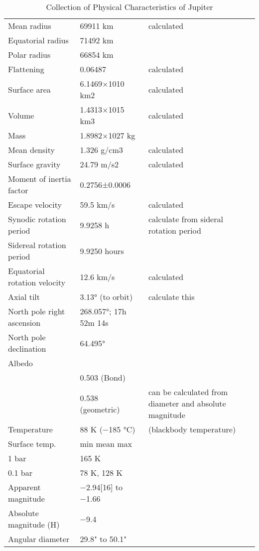 \begin{table}[h]
\begin{tabular}{ | l | l | p{3cm}|}
\hline
Mean radius&69911 km & calculated\\
Equatorial radius&71492 km & \\
Polar radius&66854 km & \\
Flattening&0.06487 & calculated\\
Surface area&6.1469×1010 km2 & calculated\\
Volume&1.4313×1015 km3 & calculated\\
Mass&1.8982×1027 kg & \\
Mean density&1.326 g/cm3 & calculated\\
Surface gravity&24.79 m/s2 & calculated\\
Moment of inertia factor&0.2756±0.0006 & \\
Escape velocity&59.5 km/s & calculated\\
Synodic rotation period&9.9258 h & calculate from sideral rotation period \\
Sidereal rotation period&9.9250 hours  & \\
Equatorial rotation velocity&12.6 km/s & calculated\\
Axial tilt&3.13° (to orbit) & calculate this\\
North pole right ascension&268.057°; 17h 52m 14s & \\
North pole declination&64.495° & \\
Albedo&&\\  
&0.503 (Bond)  & \\
&0.538 (geometric) & can be calculated from diameter and absolute magnitude\\
Temperature&88 K (−185 °C)  & (blackbody temperature) \\
Surface temp.&min mean max  &\\
1 bar& 165 K & \\
0.1 bar&78 K, 128 K& \\
Apparent magnitude&−2.94[16] to −1.66 & \\
Absolute magnitude (H)&−9.4 & \\
Angular diameter&29.8" to 50.1" & \\
\hline
\end{tabular}
\caption{Collection of Physical Characteristics of Jupiter}
\end{table}

